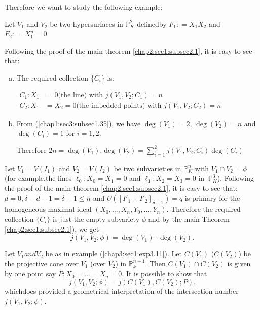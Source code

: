 Therefore we want to study the following example:
\setcounter{example}{9}
\begin{example}\label{chap3:sec1:exp3.10}
  Let $V_1$ and $V_2$ be two hypersurfaces in $\mathbb{P}^2_K$
  defined\pageoriginale by $F_1: = X_1X_2 $ and $ F_2: = X^n_1 = 0$ 

  Following the proof of the main theorem \ref{chap2:sec1:subsec2.1},
  it is easy to see that: 

\begin{enumerate}[(a)]
\item The required collection $\{ C_i\}$ is: 

  $\begin{aligned}
  C_1:  X_1 &=0 \text{(the line) with } j (V_1, V_2;C_1) = n\\
  C_2:  X_1 &= X_2 = 0 \text{(the imbedded points) with } j (V_1,
  V_2;C_2) = n 
\end{aligned}$
\item From (\ref{chap1:sec3:subsec1.35}), we have $\deg (V_1) = 2$, $\deg (V_2) = n$ and
 $\deg (C_i)= 1$ for $i = 1,2$. 
  
Therefore $2 n = \deg (V_1). \deg (V_2) =\sum\limits_{i=1}^2 j(V_1,
  V_2 ;C_i) \deg (C_i)$ 
\end{enumerate}
\end{example}

\setcounter{example}{10}
\begin{example}\label{chap3:sec1:exp3.11}
  Let $V_1 = V (I_1)$ and $V_2 = V (I_2)$ be two subvarieties in
  $\mathbb{P}^n_K $ with $ V_1 \cap V_2 = \phi $ (for example,the
  lines $\ell_0:  X_0 = X_1 =0$ and $\ell_1:  X_2 = X_3 =0 $ in $~
  \mathbb{P}^3_K$). Following the proof of the main theorem
  \ref{chap2:sec1:subsec2.1}, it
  is easy to see that:  $d=0,\delta - d- 1 = \delta - 1 \le n $  and $
  U([I'_1 + I'_2]_{\delta-1})=q$ is primary for the homogeneous
  maximal ideal $(X_0,\ldots,X_n, Y_0,\ldots,Y_n)$. Therefore  the
  required collection $\{ C_i\}$ is just the empty subvariety $\phi$
  and by the main Theorem \ref{chap2:sec1:subsec2.1}), we get  
  $$
  j(V_1, V_2 ; \phi)= \deg (V_1)\cdot \deg (V_2).
  $$
\end{example}

\setcounter{remark}{11}
\begin{remark}\label{chap3:sec1:rem3.12}
  Let $V_1 and V_2$ be as in example (\ref{chap3:sec1:exp3.11}). Let
  $C(V_1)$ (\resp   \break $C(V_2)$)
  be the projective cone over $V_1$ (\resp  over $V_2$) in
  $\mathbb{P}^{n+1}_k$. Then $C(V_1) \cap C(V_2)$ is given by one point
  say $P:X_0=\dots=X_n = 0$. It is possible to show that   
  $$
  j(V_1, V_2 ; \phi)= j(C(V_1), C(V_2); P).
  $$
  which\pageoriginale does provided a geometrical interpretation of the intersection
  number $ j (V_1, V_2 ;\phi)$. 
\end{remark}

